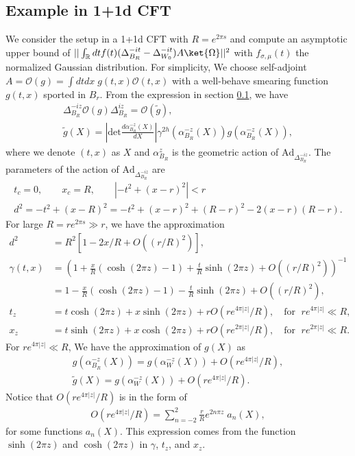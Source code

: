 \documentclass[a4paper,11pt]{article}
\theoremstyle{definition}
\begin{document}
\subsection{Example in 1+1d CFT}
We consider the setup in a 1+1d CFT with $R = e^{2\pi s}$ and compute an asymptotic upper bound of $||\int_\mathbb{R} dt f(t)(\Delta_{B_R}^{-it} - \Delta_{W_0}^{-it})A\ket{\Omega}||^2$ with $f_{\sigma,\mu}(t)$ the normalized Gaussian distribution. For simplicity, We choose self-adjoint $A = \mathcal{O}(g) = \int dtdx \;g(t,x) \mathcal{O}(t,x)$ with a well-behave smearing function $g(t,x)$ sported in $B_{r}$. From the expression in section \ref{}, we have 
\begin{gather}
    \Delta_{B_R}^{-iz} \mathcal{O}(g) \Delta_{B_R}^{iz} = \mathcal{O}(\tilde{g}),\\
    \tilde{g}(X) = \left|\text{det}\frac{d\alpha_{B_R}^{-z}(X)}{dX}\right|\gamma^{2h}(\alpha_{B_R}^{-z}(X)) g(\alpha_{B_R}^{-z}(X)),
\end{gather}
where we denote $(t,x)$ as $X$ and $\alpha_{B_R}^{z}$ is the geometric action of $\text{Ad}_{ \Delta_{B_R}^{-iz}}$. The parameters of the action of $\text{Ad}_{\Delta_{B_R}^{-iz}}$ are
\begin{gather}
    t_c = 0, \qquad x_c  = R, \qquad 
    |-t^2 + (x-r)^2| < r\\
    d^2 = -t^2 +(x-R)^2 = -t^2 + (x-r)^2 +(R-r)^2 - 2(x-r)(R-r).
\end{gather}
For large $R=re^{2\pi s}\gg r$, we have the approximation
\begin{align}
    d^2 &= R^2\left[1 -2x/R +O({(r/R)}^2)\right],\\
    \gamma(t,x)&= \left(1 + \frac{x}{R}(\cosh(2\pi z) -1)+\frac{t}{R}\sinh (2\pi z) + O((r/R)^2)\right)^{-1}\nonumber\\
    &= 1 - \frac{x}{R}(\cosh(2\pi z) -1)-\frac{t}{R}\sinh (2\pi z) + O((r/R)^2),\\
    t_z &= t\cosh (2\pi z) + x\sinh (2\pi z) + r O(re^{4\pi|z|}/R), \quad \text{for } \;re^{4\pi|z|}\ll R,\\
    x_z &= t\sinh (2\pi z) + x\cosh (2\pi z) + r O(re^{2\pi|z|}/R), \quad \text{for } \;re^{2\pi|z|}\ll R.
\end{align}
For $re^{4\pi|z|}\ll R$, We have the approximation of $g(X)$ as
\begin{gather}
    g(\alpha_{B_R}^{-z}(X)) = g(\alpha_{W}^{-z}(X)) + O(re^{4\pi|z|}/R),\\
    \tilde{g}(X) = g(\alpha_{W}^{-z}(X)) + O(re^{4\pi|z|}/R).
\end{gather}
Notice that $O(re^{4\pi|z|}/R)$ is in the form of
\begin{align}
    O(re^{4\pi|z|}/R) = \sum_{n=-2}^2\frac{r}{R} e^{2n\pi z} \; a_n(X),
\end{align}
for some functions $a_n(X)$. This expression comes from the function $\sinh(2\pi z)$ and $\cosh(2\pi z)$ in $\gamma$, $t_z$, and $x_z$.
\end{document}
